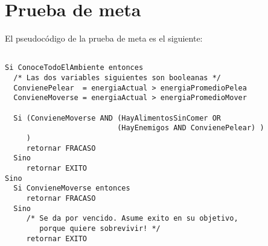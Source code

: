 \section{Prueba de meta}

El pseudocódigo de la prueba de meta es el siguiente:

\begin{verbatim}

Si ConoceTodoElAmbiente entonces
  /* Las dos variables siguientes son booleanas */
  ConvienePelear  = energiaActual > energiaPromedioPelea
  ConvieneMoverse = energiaActual > energiaPromedioMover

  Si (ConvieneMoverse AND (HayAlimentosSinComer OR 
                          (HayEnemigos AND ConvienePelear) )
     )  
     retornar FRACASO
  Sino
     retornar EXITO
Sino
  Si ConvieneMoverse entonces
     retornar FRACASO  
  Sino
     /* Se da por vencido. Asume exito en su objetivo,
        porque quiere sobrevivir! */
     retornar EXITO

\end{verbatim}


